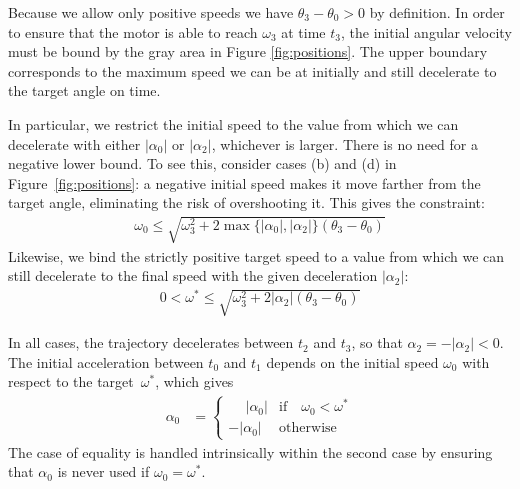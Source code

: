 \documentclass[12pt, a4paper]
{article}
\providecommand{\lr}[1]{\left(#1\right)}
\providecommand{\w}{\omega}
\providecommand{\wt}{\w^*}
\renewcommand{\th}{\theta}
\renewcommand{\a}{\alpha}
\providecommand{\w}{\omega}
\providecommand{\abs}[1]{\left|#1\right|}
\begin{document}
Because we allow only positive speeds we have $\th_3-\th_0 > 0$ by
definition. In order to ensure that the motor is able to reach $\w_3$ at time
$t_3$, the initial angular velocity must be bound by the gray area in Figure
\ref{fig:positions}. The upper boundary corresponds to the maximum speed
we can be at initially and still decelerate to the target angle on time.

In particular, we restrict the initial speed to the value from which we can
decelerate with either $\abs{\a_0}$ or $\abs{\a_2}$, whichever is larger.
There is no need for a negative lower bound. To see this, consider cases (b)
and (d) in Figure~\ref{fig:positions}: a negative initial speed makes it move
farther from the target angle, eliminating the risk of overshooting it. This
gives the constraint:
%
\begin{align}
    \w_0 \leq \sqrt{\w_3^2 + 2 \max\{ \abs{\a_0}, \abs{\a_2}\}\lr{\th_3-\th_0}}
\end{align}
%
Likewise, we bind the strictly positive target speed to a value from which we
can still decelerate to the final speed with the given deceleration
$\abs{\a_2}$:
%
\begin{align}
    0 < \wt \leq \sqrt{\w_3^2 + 2\abs{\a_2}\lr{\th_3-\th_0}}
\end{align}
%

In all cases, the trajectory decelerates between $t_2$ and $t_3$, so that
$\a_2  = - \abs{\a_2} < 0$. The initial acceleration between $t_0$ and $t_1$
depends on the initial speed $\w_0$ with respect to the \mbox{target $\wt$},
which gives
%
\begin{align}
    \label{eq:a:accel0}
    \a_0 &= 
        \begin{cases}
        \phantom{-}\abs{\a_0} & \text{if} \quad \w_0 < \wt\\ 
        -\abs{\a_0} &  \text{otherwise}
        \end{cases}
\end{align}
%
The case of equality is handled intrinsically within the
second case by ensuring that $\a_0$ is never used if $\w_0 = \wt$.
\end{document}

